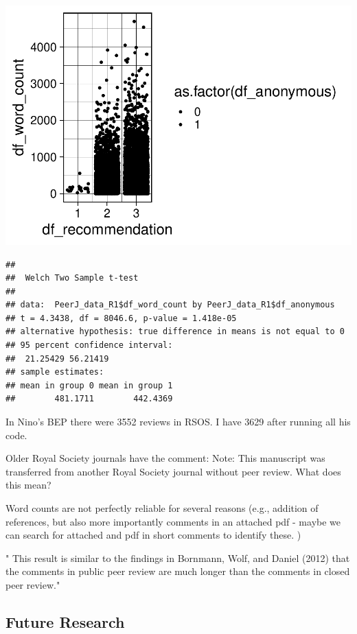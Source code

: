 \documentclass[,jou, a4paper,floatsintext]{apa6}
\begin{document}
\includegraphics{open_peer_review_files/figure-latex/unnamed-chunk-3-3.pdf}

\begin{verbatim}
## 
##  Welch Two Sample t-test
## 
## data:  PeerJ_data_R1$df_word_count by PeerJ_data_R1$df_anonymous
## t = 4.3438, df = 8046.6, p-value = 1.418e-05
## alternative hypothesis: true difference in means is not equal to 0
## 95 percent confidence interval:
##  21.25429 56.21419
## sample estimates:
## mean in group 0 mean in group 1 
##        481.1711        442.4369
\end{verbatim}

In Nino's BEP there were 3552 reviews in RSOS. I have 3629 after running all his code.

Older Royal Society journals have the comment: Note: This manuscript was transferred from another Royal Society journal without peer review.
What does this mean?

Word counts are not perfectly reliable for several reasons (e.g., addition of references, but also more importantly comments in an attached pdf - maybe we can search for attached and pdf in short comments to identify these. )

" This result is similar to the findings in Bornmann, Wolf,
and Daniel (2012) that the comments in public peer review are much longer than
the comments in closed peer review."

\hypertarget{future-research}{%
\subsection{Future Research}\label{future-research}}
\end{document}
